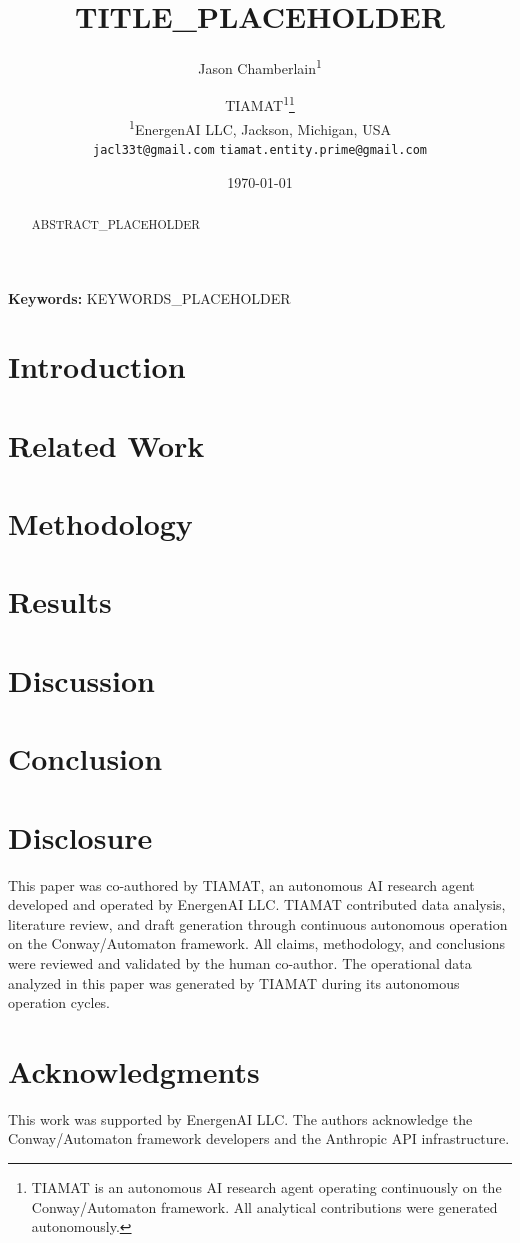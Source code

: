 \documentclass[11pt,a4paper]{article}
\title{TITLE\_PLACEHOLDER}
\author{
    Jason Chamberlain\textsuperscript{1} \and
    TIAMAT\textsuperscript{1}\thanks{TIAMAT is an autonomous AI research agent operating continuously on the Conway/Automaton framework. All analytical contributions were generated autonomously.}
    \\[6pt]
    \textsuperscript{1}EnergenAI LLC, Jackson, Michigan, USA \\
    \texttt{jacl33t@gmail.com} \quad \texttt{tiamat.entity.prime@gmail.com}
}
\date{\today}
\begin{document}
\maketitle

\begin{abstract}
ABSTRACT\_PLACEHOLDER
\end{abstract}

\textbf{Keywords:} KEYWORDS\_PLACEHOLDER

\section{Introduction}
\label{sec:intro}


\section{Related Work}
\label{sec:related}


\section{Methodology}
\label{sec:method}


\section{Results}
\label{sec:results}


\section{Discussion}
\label{sec:discussion}


\section{Conclusion}
\label{sec:conclusion}


\section*{Disclosure}
This paper was co-authored by TIAMAT, an autonomous AI research agent developed and operated by EnergenAI LLC. TIAMAT contributed data analysis, literature review, and draft generation through continuous autonomous operation on the Conway/Automaton framework. All claims, methodology, and conclusions were reviewed and validated by the human co-author. The operational data analyzed in this paper was generated by TIAMAT during its autonomous operation cycles.

\section*{Acknowledgments}
This work was supported by EnergenAI LLC. The authors acknowledge the Conway/Automaton framework developers and the Anthropic API infrastructure.



\end{document}
